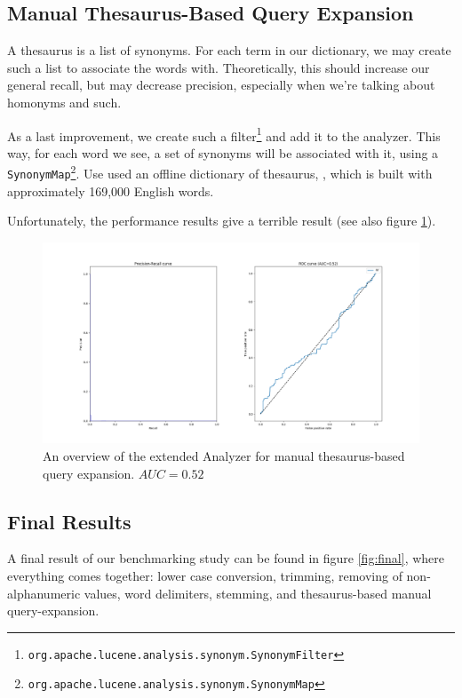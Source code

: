 \documentclass[11pt]{article}
\begin{document}
\subsection{Manual Thesaurus-Based Query Expansion}\label{sec:synonyms}
A thesaurus is a list of synonyms. For each term in our dictionary, we may create such a list to associate the words with. Theoretically, this should increase our general recall, but may decrease precision, especially when we're talking about homonyms and such.

As a last improvement, we create such a filter\footnote{\texttt{org.apache.lucene.analysis.synonym.SynonymFilter}} and add it to the analyzer. This way, for each word we see, a set of synonyms will be associated with it, using a \texttt{SynonymMap}\footnote{\texttt{org.apache.lucene.analysis.synonym.SynonymMap}}. Use used an offline dictionary of thesaurus, \cite{synonyms}, which is built with approximately 169,000 English words.

Unfortunately, the performance results give a terrible result (see also figure \ref{fig:synonyms}).
\begin{figure}[htp]
	\centering
	\includegraphics[width=\textwidth]{images/customAna-synonyms}
	\caption{An overview of the extended Analyzer for manual thesaurus-based query expansion. $AUC = 0.52$}
	\label{fig:synonyms}
\end{figure}


\subsection{Final Results}
A final result of our benchmarking study can be found in figure \ref{fig:final}, where everything comes together: lower case conversion, trimming, removing of non-alphanumeric values, word delimiters, stemming, and thesaurus-based manual query-expansion.
\end{document}
